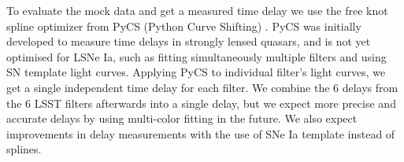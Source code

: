 To evaluate the mock data and get a measured time delay we use the
free knot spline optimizer from PyCS (Python Curve Shifting)
\citep{2013:Tewesb,Bonvin:2015jia}. PyCS was initially developed to
measure time delays in strongly lensed quasars, and is not yet
optimised for LSNe Ia, such as fitting simultaneously multiple filters
and using SN template light curves.  Applying PyCS to individual
filter's light curves, we get a single independent time delay for each
filter.  We combine the 6 delays from the 6 LSST filters afterwards
into a single delay, but we expect more precise and accurate delays by
using multi-color fitting in the future. We also expect improvements
in delay measurements with the use of SNe Ia template instead of
splines.  


